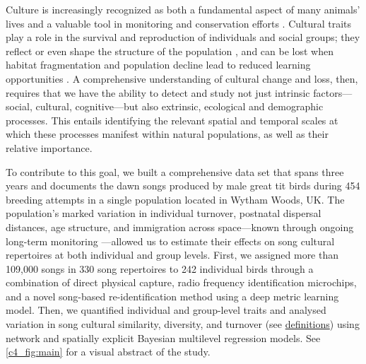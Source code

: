 \documentclass[9pt, onecolumn, twoside, lineno]{gsajnl}
\begin{document}
Culture is increasingly recognized as both a fundamental aspect of many animals' lives and a valuable tool in monitoring and conservation efforts \autocite{brakes2019, brakes2021}. Cultural traits play a role in the survival and reproduction of individuals and social groups; they reflect or even shape the structure of the population \autocite{brakes2019}, and can be lost when habitat fragmentation and population decline lead to reduced learning opportunities \autocite{paxton2019, crates2021}. A comprehensive understanding of cultural change and loss, then, requires that we have the ability to detect and study not just intrinsic factors---social, cultural, cognitive---but also extrinsic, ecological and demographic processes. This entails identifying the relevant spatial and temporal scales at which these processes manifest within natural populations, as well as their relative importance. 

To contribute to this goal, we built a comprehensive data set that spans three years and documents the dawn songs produced by male great tit birds during 454 breeding attempts in a single population located in Wytham Woods, UK. The population's marked variation in individual turnover, postnatal dispersal distances, age structure, and immigration across space---known through ongoing long-term monitoring \autocite{lack1964}---allowed us to estimate their effects on song cultural repertoires at both individual and group levels. First, we assigned more than 109,000 songs in 330 song repertoires to 242 individual birds through a combination of direct physical capture, radio frequency identification microchips, and a novel song-based re-identification method using a deep metric learning model. Then, we quantified individual and group-level traits and analysed variation in song cultural similarity, diversity, and turnover (see \hyperref[sc:group-properties]{definitions}) using network and spatially explicit Bayesian multilevel regression models. See \autoref{c4_fig:main} for a visual abstract of the study.
\end{document}

